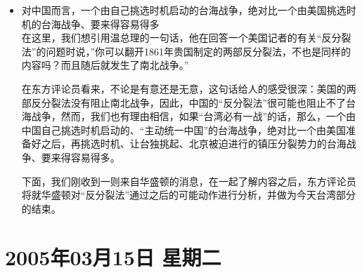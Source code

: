 \documentclass[a4paper,11pt]{article}
\begin{document}
\begin{itemize}
\begin{itemize}
 

\item 对中国而言，一个由自己挑选时机启动的台海战争，绝对比一个由美国挑选时机的台海战争、要来得容易得多\\
\label{sec-2_3_12}%
在这里，我们想引用温总理的一句话，他在回答一个美国记者的有关“反分裂法”的问题时说，''你可以翻开1861年贵国制定的两部反分裂法，不也是同样的内容吗？而且随后就发生了南北战争。''

    在东方评论员看来，不论是有意还是无意，这句话给人的感受很深：美国的两部反分裂法没有阻止南北战争，因此，中国的“反分裂法”很可能也阻止不了台海战争，然而，我们也有理由相信，如果“台湾必有一战”的话，那么，一个由中国自己挑选时机启动的、“主动统一中国”的台海战争，绝对比一个由美国准备好之后，再挑选时机、让台独挑起、北京被迫进行的镇压分裂势力的台海战争、要来得容易得多。

    下面，我们刚收到一则来自华盛顿的消息，在一起了解内容之后，东方评论员将就华盛顿对“反分裂法”通过之后的可能动作进行分析，并做为今天台湾部分的结束。





\end{itemize} %
\end{itemize} %
\section{2005年03月15日 星期二}
\label{sec-3}
\end{document}
